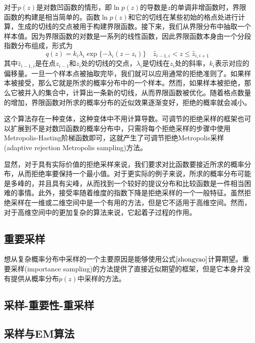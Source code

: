 对于$p(z)$是对数凹函数的情形，即$\ln p(z)$的导数是$z$的单调非增函数时，界限函数的构建是相当简单的。函数$\ln p(z)$和它的切线在某些初始的格点处进行计算，生成的切线的交点被用于构建界限函数。接下来，我们从界限分布中抽取一个样本值。因为界限函数的对数是一系列的线性函数，因此界限函数本身由一个分段指数分布组成，形式为
\begin{equation}
	q(z)=k_i\lambda_i\exp \{-\lambda_i(z-z_i) \}\quad \hat{z}_{i-1,i}<z\leqslant \hat{z}_{i,i+1}
\end{equation}
其中$\hat{z}_{i-1,i}$是在点$z_{i-1}$和$z_i$处的切线的交点，$\lambda_i$是切线在$z_i$处的斜率，$k_i$表示对应的偏移量。一旦一个样本点被抽取完毕，我们就可以应用通常的拒绝准则了。如果样本被接受，那么它就是所求的概率分布中的一个样本。然而，如果样本被拒绝，那么它被并入的集合中，计算出一条新的切线，从而界限函数被优化。随着格点数量的增加，界限函数对所求的概率分布的近似效果逐渐变好，拒绝的概率就会减小。

这个算法存在一种变体，这种变体中不用计算导数。可调节的拒绝采样的框架也可以扩展到不是对数凹函数的概率分布中，只需将每个拒绝采样的步骤中使用Metropolis-Hasting阶梯函数即可，这就产生了可调节拒绝Metropolis采样(adaptive rejection Metropolis sampling)方法。

显然，对于具有实际价值的拒绝采样来说，我们要求对比函数要接近所求的概率分布，从而拒绝率要保持一个最小值。对于更实际的例子来说，所求的概率分布可能是多峰的，并且具有尖峰，从而找到一个较好的提议分布和比较函数是一件相当困难的事情。此外，接受率随着维度的指数下降是拒绝采样的一个一般特征。虽然拒绝采样在一维或二维空间中是一个有用的方法，但是它不适用于高维空间。然而，对于高维空间中的更加复杂的算法来说，它起着子过程的作用。
\subsection*{重要采样}
想从复杂概率分布中采样的一个主要原因是能够使用公式$\ref{zhongyao}$计算期望。重要采样(importance sampling)的方法提供了直接近似期望的框架，但是它本身并没有提供从概率分布$p(z)$中采样的方法。
\subsection*{采样-重要性-重采样}
\subsection*{采样与EM算法}
